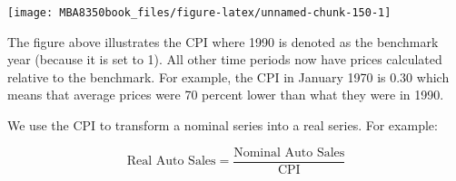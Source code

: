 \documentclass[
]{book}
\newenvironment{Shaded}{\begin{snugshade}}{\end{snugshade}}
\newcommand{\AttributeTok}[1]{\textcolor[rgb]{0.77,0.63,0.00}{#1}}
\newcommand{\ConstantTok}[1]{\textcolor[rgb]{0.00,0.00,0.00}{#1}}
\newcommand{\DecValTok}[1]{\textcolor[rgb]{0.00,0.00,0.81}{#1}}
\newcommand{\FunctionTok}[1]{\textcolor[rgb]{0.00,0.00,0.00}{#1}}
\newcommand{\NormalTok}[1]{#1}
\newcommand{\OtherTok}[1]{\textcolor[rgb]{0.56,0.35,0.01}{#1}}
\newcommand{\SpecialCharTok}[1]{\textcolor[rgb]{0.00,0.00,0.00}{#1}}
\newcommand{\StringTok}[1]{\textcolor[rgb]{0.31,0.60,0.02}{#1}}
\begin{document}
\begin{Shaded}
\end{Shaded}

\begin{center}\texttt{[image: MBA8350book\_files/figure-latex/unnamed-chunk-150-1]} \end{center}

The figure above illustrates the CPI where 1990 is denoted as the benchmark year (because it is set to 1). All other time periods now have prices calculated relative to the benchmark. For example, the CPI in January 1970 is \(0.30\) which means that average prices were 70 percent lower than what they were in 1990.

We use the CPI to transform a nominal series into a real series. For example:

\[\mbox{Real Auto Sales} = \frac{\mbox{Nominal Auto Sales}}{\mbox{CPI}}\]
\end{document}
